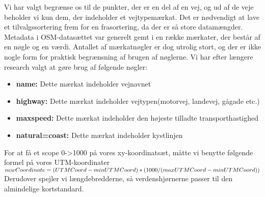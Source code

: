Vi har valgt begrænse os til de punkter, der er en del af en vej, og ud af de veje beholder vi kun dem, der indeholder et vejtypemærkat. Det er nødvendigt at lave et tilvalgssortering frem for en frasortering, da der er så store datamængder. Metadata i OSM-datasættet var generelt gemt i en række mærkater, der består af en nøgle og en værdi. Antallet af mærkatnøgler er dog utrolig stort, og der er ikke nogle form for praktisk begrænsning af brugen af nøglerne. Vi har efter længere research valgt at gøre brug af følgende nøgler:

\begin{itemize}
	\item \textbf{name:} Dette mærkat indeholder vejnavnet
	\item \textbf{highway:} Dette mærkat indeholder vejtypen(motorvej, landevej, gågade etc.)
	\item \textbf{maxspeed:} Dette mærkat indeholder den højeste tilladte transporthastighed
	\item \textbf{natural=coast:} Dette mærkat indeholder kystlinjen
\end{itemize}

For at få et scope 0->1000 på vores xy-koordinatsæt, måtte vi benytte følgende formel på vores UTM-koordinater $newCoordinate = \\(UTMCoord-minUTMCoord) * (1000/(maxUTMCoord-minUTMCoord)) $\\ Derudover spejler vi længdebredderne, så verdenshjørnerne passer til den almindelige kortstandard.
